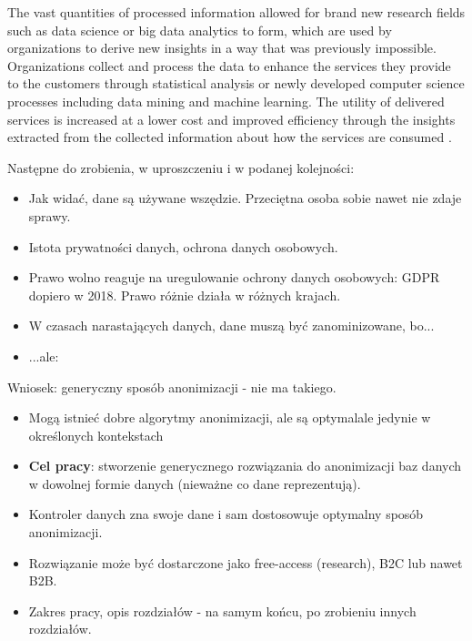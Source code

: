 \documentclass[a4paper,twoside,12pt]{book}
\begin{document}
The vast quantities of processed information allowed for brand new research fields such as data science or big data analytics to form, which are used by organizations to derive new insights in a way that was previously impossible. Organizations collect and process the data to enhance the services they provide to the customers through statistical analysis or newly developed computer science processes including data mining and machine learning. The utility of delivered services is increased at a lower cost and improved efficiency through the insights extracted from the collected information about how the services are consumed \cite{bib:anonymization_pipeline}.


\vfill

\footnotesize
\color{blue}
Następne do zrobienia, w uproszczeniu i w podanej kolejności:
\begin{itemize}
\item Jak widać, dane są używane wszędzie. Przeciętna osoba sobie nawet nie zdaje sprawy.
\item Istota prywatności danych, ochrona danych osobowych.
\item Prawo wolno reaguje na uregulowanie ochrony danych osobowych: GDPR dopiero w 2018. Prawo różnie działa w różnych krajach.
\item W czasach narastających danych, dane muszą być zanominizowane, bo...
\item ...ale:
\end{itemize}

\normalsize
\color{black}

\footnotesize
\color{blue}
Wniosek: generyczny sposób anonimizacji - nie ma takiego.

\begin{itemize}
\item Mogą istnieć dobre algorytmy anonimizacji, ale są optymalale jedynie w określonych kontekstach

\item \textbf{Cel pracy}: stworzenie generycznego rozwiązania do anonimizacji baz danych w dowolnej formie danych (nieważne co dane reprezentują).

\item Kontroler danych zna swoje dane i sam dostosowuje optymalny sposób anonimizacji.

\item Rozwiązanie może być dostarczone jako free-access (research), B2C lub nawet B2B.

\item Zakres pracy, opis rozdziałów - na samym końcu, po zrobieniu innych rozdziałów.
\normalsize

\end{itemize}
\color{black}
\normalsize
\end{document}
